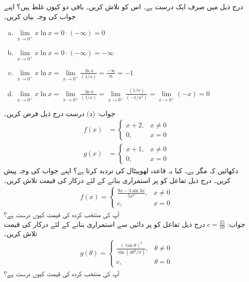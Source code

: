 درج ذیل میں صرف ایک درست ہے۔ اس کو تلاش کریں۔ باقی دو کیوں غلط ہیں؟ اپنے جواب کی وجہ بیان کریں۔
\begin{enumerate}[a.]
\item
$\lim\limits_{x\to 0^+}x\ln x=0\cdot(-\infty)=0$
\item
$\lim\limits_{x\to 0^+}x\ln x=0\cdot(-\infty)=-\infty$
\item
$\lim\limits_{x\to 0^+}x\ln x=\lim\limits_{x\to 0^+}\frac{\ln x}{(1/x)}=\frac{-\infty}{\infty}=-1$
\item
$\lim\limits_{x\to 0^+}x\ln x=\lim\limits_{x\to 0^+}\frac{\ln x}{(1/x)}=\lim\limits_{x\to 0^+}\frac{(1/x)}{(-1/{x^2})}=\lim\limits_{x\to 0^+}(-x)=0$
\end{enumerate}
جواب:\quad
(د) درست
درج ذیل فرض کریں۔
\begin{align*}
f(x)&=
\begin{cases}
x+2,&x\ne 0\\
0,&x=0
\end{cases}\\
g(x)&=
\begin{cases}
x+1,&x\ne 0\\
0,&x=0
\end{cases}
\end{align*}
دکھائیں کہ  مگر  ہے۔ کیا یہ قاعدہ لھوپیٹال کی تردید کرتا ہے؟ اپنے جواب  کی وجہ پیش کریں۔
درج ذیل تفاعل کو  پر استمراری بنانے کے لئے درکار  کی قیمت تلاش کریں۔
\begin{align*}
f(x)=
\begin{cases}
\frac{9x-3\sin 3x}{5x^3},&x\ne 0\\
c,&x=0
\end{cases}
\end{align*}
آپ کی منتخب کردہ  کی قیمت کیوں درست ہے؟\\
جواب:\quad
$c=\tfrac{25}{10}$
درج ذیل تفاعل کو  پر دائیں سے استمراری بنانے کے لئے درکار  کی قیمت تلاش کریں۔
\begin{align*}
g(\theta)=
\begin{cases}
\frac{(\tan\theta)^2}{\sin(4\theta^2/\pi)},&\theta\ne0\\
c,&\theta=0
\end{cases}
\end{align*}
آپ کی منتخب کردہ  کی قیمت کیوں درست ہے؟
